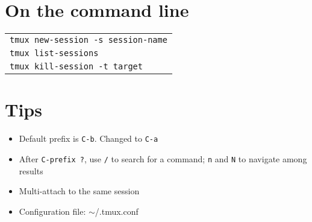 \documentclass[landscape]{article}
\newcommand{\blankfirst}{%
  \ifodd\rownum\advance\rownum1\relax\fi}
\newcommand{\coloredfirst}{%
  \blankfirst\advance\rownum1\relax}
\begin{document}
\begin{multicols}{3}
  \section*{On the command line}
  \ifodd\rownum\advance{}\relax\fi
  \coloredfirst
  \begin{tabular}{p{2.9in}}
    \verb|tmux new-session -s session-name|\\
    \verb|tmux list-sessions|\\
    \verb|tmux kill-session -t target|
  \end{tabular}
  \section*{Tips}
  \begin{itemize}
  \item Default prefix is \verb|C-b|. Changed to \verb|C-a|
  \item After \verb|C-prefix ?|, use \verb|/| to search for a command;
    \verb|n| and \verb|N| to navigate among results
  \item Multi-attach to the same session
  \item Configuration file: $\sim$/.tmux.conf
  \end{itemize}
\end{multicols}
\end{document}
